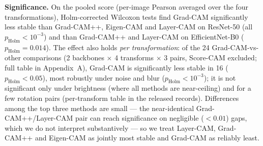 \documentclass[runningheads]{llncs}
\begin{document}
\begin{table}[t]
\centering
\caption{Explanation stability averaged over the four transformations (mean with
bootstrap 95\% CI; higher is better). $n{=}38$ except Score-CAM ($n{=}12$). The
wide, overlapping CIs are consistent with the significance analysis: methods are
\emph{ordered} but individual per-transform differences are not powered at $n{=}38$.}
\label{tab:stab}
\end{table}


\noindent\textbf{Significance.} On the pooled score (per-image Pearson averaged
over the four transformations), Holm-corrected Wilcoxon tests find Grad-CAM
significantly less stable than Grad-CAM++, Eigen-CAM and Layer-CAM on ResNet-50
(all $p_{\text{Holm}}<10^{-3}$) and than Grad-CAM++ and Layer-CAM on
EfficientNet-B0 ($p_{\text{Holm}}=0.014$). The effect also holds
\emph{per transformation}: of the 24 Grad-CAM-vs-other comparisons (2 backbones
$\times$ 4 transforms $\times$ 3 pairs, Score-CAM excluded; full table in
Appendix~A), Grad-CAM is significantly less stable in 16 ($p_{\text{Holm}}<0.05$),
most robustly under noise and blur
($p_{\text{Holm}}<10^{-3}$); it is not significant only under brightness (where all
methods are near-ceiling) and for a few rotation pairs (per-transform table in the
released records). Differences among the top three methods are small --- the
near-identical Grad-CAM++/Layer-CAM pair can reach significance on negligible
($<0.01$) gaps, which we do not interpret substantively --- so we treat Layer-CAM,
Grad-CAM++ and Eigen-CAM as jointly most stable and Grad-CAM as reliably least.
\end{document}
